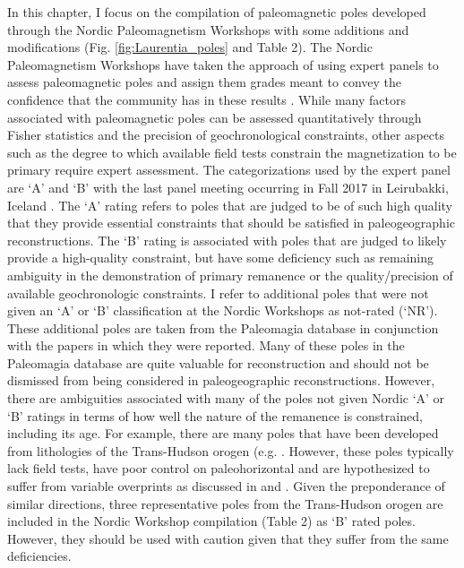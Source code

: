\documentclass[twocolumn, switch]{article} %
\begin{document}
In this chapter, I focus on the compilation of paleomagnetic poles developed through the Nordic Paleomagnetism Workshops with some additions and modifications (Fig. \ref{fig:Laurentia_poles} and Table 2). The Nordic Paleomagnetism Workshops have taken the approach of using expert panels to assess paleomagnetic poles and assign them grades meant to convey the confidence that the community has in these results \citep{Evans2021a}. While many factors associated with paleomagnetic poles can be assessed quantitatively through Fisher statistics and the precision of geochronological constraints, other aspects such as the degree to which available field tests constrain the magnetization to be primary require expert assessment. The categorizations used by the expert panel are `A' and `B' with the last panel meeting occurring in Fall 2017 in Leirubakki, Iceland \citep{Brown2018a}. The `A' rating refers to poles that are judged to be of such high quality that they provide essential constraints that should be satisfied in paleogeographic reconstructions. The `B' rating is associated with poles that are judged to likely provide a high-quality constraint, but have some deficiency such as remaining ambiguity in the demonstration of primary remanence or the quality/precision of available geochronologic constraints. I refer to additional poles that were not given an `A' or `B' classification at the Nordic Workshops as not-rated (`NR'). These additional poles are taken from the Paleomagia database \citep{Veikkolainen2014a} in conjunction with the papers in which they were reported. Many of these poles in the Paleomagia database are quite valuable for reconstruction and should not be dismissed from being considered in paleogeographic reconstructions. However, there are ambiguities associated with many of the poles not given Nordic `A' or `B' ratings in terms of how well the nature of the remanence is constrained, including its age. For example, there are many poles that have been developed from lithologies of the Trans-Hudson orogen (e.g. \citealp{Symons2005a}. However, these poles typically lack field tests, have poor control on paleohorizontal and are hypothesized to suffer from variable overprints as discussed in \cite{Raub2008a} and \cite{DAgrella-Filho2020a}. Given the preponderance of similar directions, three representative poles from the Trans-Hudson orogen are included in the Nordic Workshop compilation (Table 2) as `B' rated poles. However, they should be used with caution given that they suffer from the same deficiencies. 
\end{document}

